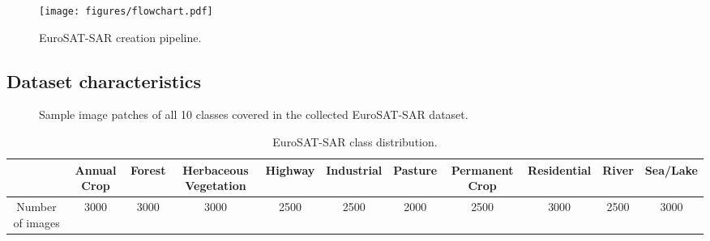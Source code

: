 \documentclass[lettersize,journal]{IEEEtran}
\begin{document}
\vspace{-0.5em}
\begin{figure}[h]
    \centering
    \texttt{[image: figures/flowchart.pdf]}
    \caption{EuroSAT-SAR creation pipeline.}
    \label{fig:flowchart}
\end{figure}

\vspace{-1em}
\subsection{\textbf{Dataset characteristics}}


\begin{figure}[h!]
    \centering
    
    \vspace{-0.5em}
    \vspace{-0.5em}
    \vspace{-0.5em}
    \vspace{-0.5em}
    \vspace{-0.5em}
    
    \caption{Sample image patches of all 10 classes covered in the collected EuroSAT-SAR dataset.}
    \label{fig:eu-sar-example}
\end{figure}



\vspace{-0.5em}
\begin{table*}[hb]
\centering
\caption{EuroSAT-SAR class distribution.}
\label{tab:eu-class}
\begin{tabular}{ccccccccccc}
\toprule
                 & Annual Crop & Forest & Herbaceous Vegetation & Highway & Industrial & Pasture & Permanent Crop & Residential & River & Sea/Lake \\ \hline
Number of images & 3000        & 3000   & 3000                  & 2500    & 2500       & 2000    & 2500           & 3000        & 2500  & 3000 \\   
\bottomrule
\end{tabular}
\end{table*}
\end{document}
